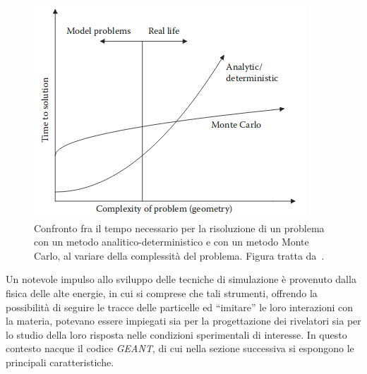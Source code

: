 \begin{figure} [!t]
	\centering
	\includegraphics[scale=0.66]{Grafici/monte_carlo_vs_analytic2.png}
	\caption{Confronto fra il tempo necessario per la risoluzione di un problema con un metodo analitico-deterministico e con un metodo Monte Carlo, al variare della complessità del problema. Figura tratta da~\cite{bielajew:13}.} \label{fig:monte_carlo}
\end{figure}




%
%
Un notevole impulso allo sviluppo delle tecniche di simulazione è provenuto dalla fisica delle alte energie, in cui si comprese che tali strumenti, offrendo la possibilità di seguire le tracce delle particelle ed ``imitare'' le loro interazioni con la materia, potevano essere impiegati sia per la progettazione dei rivelatori sia per lo studio della loro risposta nelle condizioni sperimentali di interesse.
In questo contesto nacque il codice \emph{GEANT}, di cui nella sezione successiva si espongono le principali caratteristiche.






